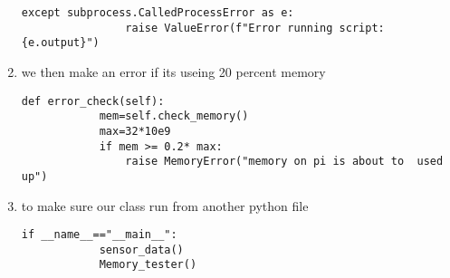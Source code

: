 \begin{enumerate}
\begin{lstlisting}[style=mystyle]
            except subprocess.CalledProcessError as e:
                raise ValueError(f"Error running script:{e.output}")
    \end{lstlisting}
    \item  we then  make an error if its useing  20 percent memory
    \begin{lstlisting}[style=mystyle]
        def error_check(self):
            mem=self.check_memory()
            max=32*10e9
            if mem >= 0.2* max:
                raise MemoryError("memory on pi is about to  used up")
    \end{lstlisting}
    \item to make sure  our class run from another python file 
    \begin{lstlisting}[style=mystyle]
        if __name__=="__main__":
            sensor_data()
            Memory_tester()
    \end{lstlisting}
\end{enumerate}
